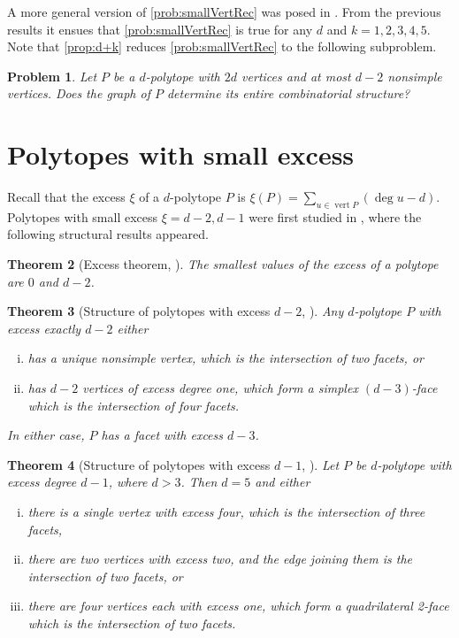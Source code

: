 \documentclass[a4paper]{amsart}
\newtheorem{theorem}{Theorem}
\newtheorem{problem}[theorem]{Problem}
\theoremstyle{definition}
\theoremstyle{remark}
\begin{document}
A more general version of \cref{prob:smallVertRec} was posed in \cite{NevPinUgo17}. From the previous results it ensues that \cref{prob:smallVertRec} is true for any $d$ and $k=1,2,3,4,5$.  Note that \cref{prop:d+k} reduces \cref{prob:smallVertRec} to the following subproblem.

\begin{problem}\label{prob:2dVert} Let $P$ be a $d$-polytope with $2d$ vertices and  at most $d-2$ nonsimple vertices. Does the graph of $P$ determine its entire combinatorial structure? \end{problem}

\section{Polytopes with small excess} Recall that the excess $\xi$ of a $d$-polytope $P$ is $\xi(P)=\sum_{u\in \operatorname{vert} P} (\deg u-d)$. Polytopes with small excess $\xi=d-2,d-1$ were first studied in \cite{PinUgoYos16a}, where the following structural results appeared.

\begin{theorem}[Excess theorem, {\cite[Thm.~3.3]{PinUgoYos16a}}]\label{thm:excess} The smallest values of the excess of a polytope are $0$ and $d-2$.
\end{theorem}

\begin{theorem}[Structure of polytopes with excess $d-2$, {\cite[Thm.~4.7]{PinUgoYos16a}}]\label{thm:excess-d-2-full-story} Any $d$-polytope $P$  with excess exactly $d-2$ either

\begin{enumerate}[(i)]
\item has a unique nonsimple vertex, which is the intersection of two facets, or
\item has $d-2$ vertices of excess degree one, which form a simplex $(d-3)$-face which is the intersection of four facets.
\end{enumerate}  

In either case, $P$ has a facet with excess $d-3$.
\end{theorem}
\begin{theorem}[Structure of polytopes with excess $d-1$, {\cite[Thm.~4.16]{PinUgoYos16a}}]\label{thm:excess-d-1-full-story} Let $P$ be $d$-polytope with  excess degree $d-1$, where  $d>3$. Then $d=5$ and either

\begin{enumerate}[(i)]
\item there is a single vertex with excess four, which is the intersection of three facets,

\item there are two vertices with excess two, and the edge joining them is the intersection of two facets, or

\item there are four vertices each with excess one, which form a quadrilateral 2-face which is the intersection of two facets.
\end{enumerate}
\end{theorem}
\end{document}
